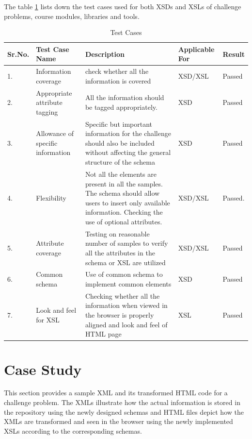 \documentclass[11pt,letterpaper]{report}
\begin{document}
The table \ref{table:test} lists down the test cases used for both XSDs and XSLs of challenge problems, course modules, libraries and tools.
\begin{table}
\begin{tabular}{| l | p{2cm} | p{5cm} | p{2cm} | p{1cm} |}
\hline \textbf{Sr.No.} & \textbf{Test Case Name} & \textbf{Description} & \textbf{Applicable For} & \textbf{Result} \\ \hline 1. & Information coverage & check whether all the information is covered & XSD/XSL & Passed \\ 
\hline 2. & Appropriate attribute tagging & All the information should be tagged appropriately.  & XSD & Passed  \\  
\hline 3.& Allowance of specific information  & Specific but important information for the challenge should also be included without affecting the general structure of the schema & XSD & Passed \\ 
\hline 4.& Flexibility & Not all the elements are present in all the samples. The schema should allow users to insert only available information. Checking the use of optional attributes. & XSD/XSL & Passed. \\ 
\hline 5. & Attribute coverage & Testing on reasonable number of samples to verify all the attributes in the schema or XSL are utilized & XSD/XSL & Passed \\  
\hline 6. & Common schema & Use of common schema to implement common elements & XSD & Passed \\  
\hline 7. & Look and feel for XSL & Checking whether all the information when viewed in the browser is properly aligned and look and feel of HTML page & XSL & Passed \\ 
\hline
\end{tabular}
\caption[Table caption text]{Test Cases}
\label{table:test}
\end{table}
\pagebreak
\section{Case Study}
This section provides a sample XML and its transformed HTML code for a challenge problem. The XMLs illustrate how the actual information is stored in the repository using the newly designed schemas and HTML files depict how the XMLs are transformed and seen in the browser using the newly implemented XSLs according to the corresponding schemas. 
\end{document}

